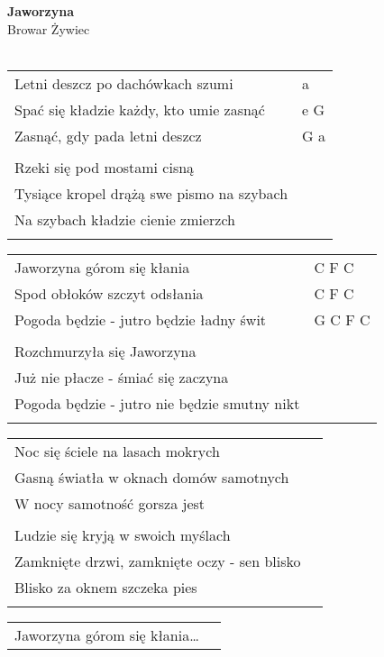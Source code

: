 \documentclass[a5paper]{article}
\begin{document}


\noindent
\fontsize{12pt}{15pt}\selectfont
\textbf{Jaworzyna} \\
\fontsize{8pt}{10pt}\selectfont
Browar Żywiec \\ \\
\fontsize{10pt}{12pt}\selectfont
{}
\begin{tabular}{@{}p{8.50cm}p{3cm}@{}}
\noindent
Letni deszcz po dachówkach szumi & a \\
Spać się kładzie każdy, kto umie zasnąć & e G \\
Zasnąć, gdy pada letni deszcz & G a \\ \\
 
Rzeki się pod mostami cisną \\
Tysiące kropel drążą swe pismo na szybach \\
Na szybach kładzie cienie zmierzch \\ \\
\end{tabular}

\noindent
\begin{tabular}{@{}p{7.50cm}p{3cm}@{}}
Jaworzyna górom się kłania & C F C \\
Spod obłoków szczyt odsłania & C F C \\
Pogoda będzie - jutro będzie ładny świt & G C F C \\ \\
 
Rozchmurzyła się Jaworzyna \\
Już nie płacze - śmiać się zaczyna \\
Pogoda będzie - jutro nie będzie smutny nikt \\ \\
\end{tabular}

\noindent
\begin{tabular}{@{}p{8.50cm}p{3cm}@{}} 
Noc się ściele na lasach mokrych \\
Gasną światła w oknach domów samotnych \\
W nocy samotność gorsza jest \\ \\
 
Ludzie się kryją w swoich myślach \\
Zamknięte drzwi, zamknięte oczy - sen blisko \\
Blisko za oknem szczeka pies \\ \\
\end{tabular}

\noindent
\begin{tabular}{@{}p{7.50cm}p{3cm}@{}} 
Jaworzyna górom się kłania…
\end{tabular}
\end{document}

